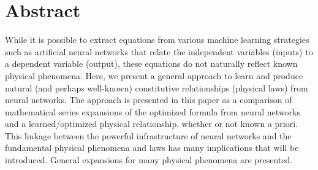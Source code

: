 \section{Abstract}\label{Abstract}

While it is possible to extract equations from various machine learning strategies such as artificial neural networks that relate the independent variables (inputs) to a dependent variable (output), these equations do not naturally reflect known physical phenomena. Here, we present a general approach to learn and produce natural (and perhaps well-known) constitutive relationships (physical laws) from neural networks. The approach is presented in this paper as a comparison of mathematical series expansions of the optimized formula from neural networks and a learned/optimized physical relationship, whether or not known a priori.
This linkage between the powerful infrastructure of neural networks and the fundamental physical phenomena and laws has many implications that will be introduced. General expansions for many physical phenomena are presented.
